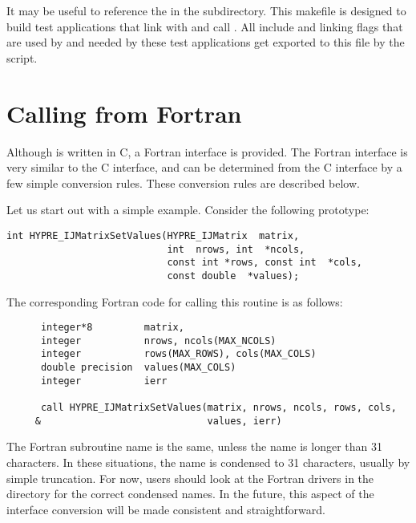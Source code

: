 It may be useful to reference the  in the 
subdirectory.  This makefile is designed to build test applications
that link with and call \hypre{}.  All include and linking flags that
are used by \hypre{} and needed by these test applications get
exported to this file by the  script.


\section{Calling from Fortran}
\label{Calling from Fortran}

Although \hypre{} is written in C, a Fortran interface is provided.
The Fortran interface is very similar to the C interface, and can be
determined from the C interface by a few simple conversion rules.
These conversion rules are described below.

Let us start out with a simple example.  Consider the following
\hypre{} prototype:
\begin{display}
\begin{verbatim}
int HYPRE_IJMatrixSetValues(HYPRE_IJMatrix  matrix,
                            int  nrows, int  *ncols,
                            const int *rows, const int  *cols,
                            const double  *values);
\end{verbatim}
\end{display}
The corresponding Fortran code for calling this routine is as follows:
\begin{display}
\begin{verbatim}
      integer*8         matrix, 
      integer           nrows, ncols(MAX_NCOLS)
      integer           rows(MAX_ROWS), cols(MAX_COLS)
      double precision  values(MAX_COLS)
      integer           ierr

      call HYPRE_IJMatrixSetValues(matrix, nrows, ncols, rows, cols,
     &                             values, ierr)
\end{verbatim}
\end{display}
The Fortran subroutine name is the same, unless the name is longer
than 31 characters.  In these situations, the name is condensed to 31
characters, usually by simple truncation.  For now, users should look
at the Fortran drivers in the  directory for the correct
condensed names.  In the future, this aspect of the interface conversion
will be made consistent and straightforward.

